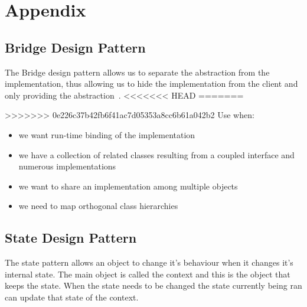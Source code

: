 \chapter{Appendix}

\section{Bridge Design Pattern}
The Bridge design pattern allows us to separate the abstraction from the implementation, thus
allowing us to hide the implementation from the client and only providing the abstraction~\citep{oodesign}.
<<<<<<< HEAD
=======

>>>>>>> 0e226c37b42fb6f41ac7d05353a8cc6b61a042b2
Use when:
\begin{itemize}
	\item we want run-time binding of the implementation
	\item we have a collection of related classes resulting from a coupled interface and numerous
	implementations
	\item we want to share an implementation among multiple objects
	\item we need to map orthogonal class hierarchies
\end{itemize}

\section{State Design Pattern}
The state pattern allows an object to change it's behaviour when it changes it's internal state. The main object is called the context and this is the object that keeps the state. When the state needs to be changed the state currently being ran can update that state of the context.
